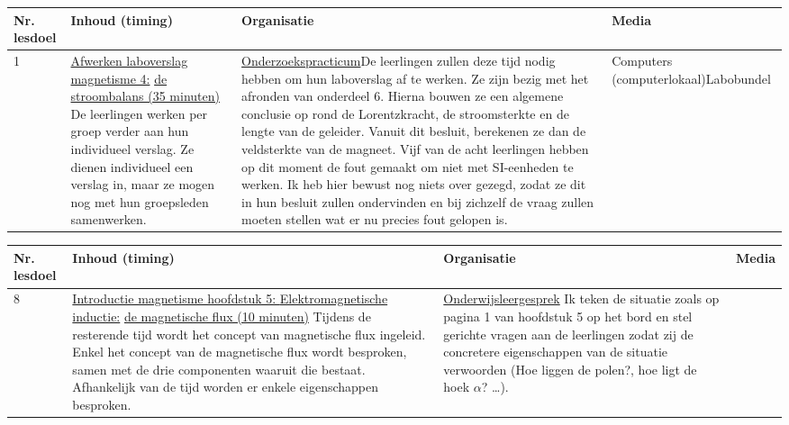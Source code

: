 \begin{landscape}
\begin{tabularx}{1.56\textwidth}{|p{1.5cm}|p{9cm}|X|p{4cm}|}
	\hline
	\textbf{Nr. lesdoel } & \textbf{Inhoud (timing)}  & \textbf{Organisatie } & \textbf{Media } \\ \hline
	1\newline\newline 2\newline\newline 3\newline\newline 4\newline\newline 5\newline\newline 6\newline\newline 7&\underline{Afwerken laboverslag magnetisme 4:} \underline{de stroombalans (35 minuten)}\newline
	De leerlingen werken per groep verder aan hun individueel verslag. Ze  dienen individueel een verslag in, maar ze mogen nog met hun groepsleden samenwerken.
	&  \underline{Onderzoekspracticum}\newline De leerlingen zullen deze tijd nodig hebben om hun laboverslag af te werken. Ze zijn bezig met het afronden van onderdeel 6. Hierna bouwen ze een algemene conclusie op rond de Lorentzkracht, de stroomsterkte en de lengte van de geleider. Vanuit dit besluit, berekenen ze dan de veldsterkte van de magneet. Vijf van de acht leerlingen hebben op dit moment de fout gemaakt om niet met SI-eenheden te werken. Ik heb hier bewust nog niets over gezegd, zodat ze dit in hun besluit zullen ondervinden en bij zichzelf de vraag zullen moeten stellen wat er nu precies fout gelopen is.
	&  Computers (computerlokaal)\newline\newline Labobundel
	\\ \hline
\end{tabularx}

\begin{tabularx}{1.56\textwidth}{|p{1.5cm}|p{9cm}|X|p{4cm}|}
	\hline
	\textbf{Nr. lesdoel } & \textbf{Inhoud (timing)}  & \textbf{Organisatie } & \textbf{Media } \\ \hline
	8\newline\newline 9&\underline{Introductie magnetisme hoofdstuk 5:  } \underline{ Elektromagnetische inductie:} \underline{de magnetische flux (10 minuten)}\newline
	Tijdens de resterende tijd wordt het concept van magnetische flux ingeleid. Enkel het concept van de magnetische flux wordt besproken, samen met de drie componenten waaruit die bestaat. Afhankelijk van de tijd worden er enkele eigenschappen besproken.
	&  \underline{Onderwijsleergesprek}\newline 
	Ik teken de situatie zoals op pagina 1 van hoofdstuk 5 op het bord en stel gerichte vragen aan de leerlingen zodat zij de concretere eigenschappen van de situatie verwoorden (Hoe liggen de polen?, hoe ligt de hoek $\alpha$? \ldots).
	

\end{tabularx}
\end{landscape}
